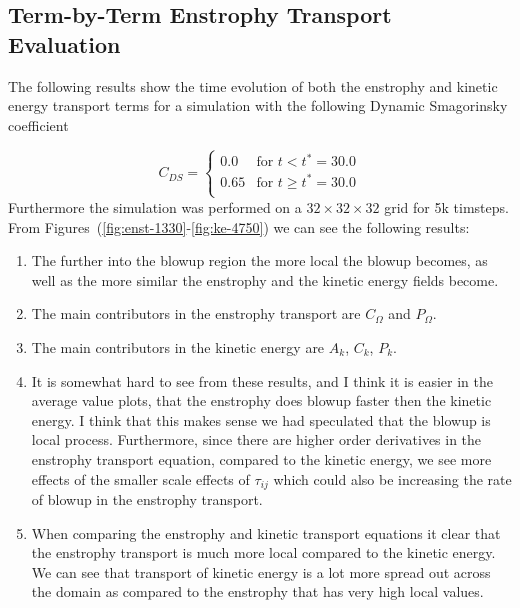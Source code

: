 \newpage
\subsection{Term-by-Term Enstrophy Transport Evaluation}
The following results show the time evolution of both the enstrophy and
kinetic energy transport terms for a simulation with the following Dynamic
Smagorinsky coefficient

\begin{equation}
    C_{DS} = 
    \begin{cases}
        0.0         &   \text{for $t  < t^{\ast} = 30.0$} \\
        0.65        &   \text{for $t \geq t^{\ast} = 30.0 $} \\
    \end{cases}
\end{equation}
Furthermore the simulation was performed on a $32 \times 32 \times 32$ grid
for 5k timsteps.  From Figures~(\ref{fig:enst-1330}-\ref{fig:ke-4750}) we
can see the following results:
\begin{enumerate}
    \item The further into the blowup region the more local the blowup
        becomes, as well as the more similar the enstrophy and the kinetic
        energy fields become.
        
    \item The main contributors in the enstrophy transport are
        $C_{\Omega}$ and $P_{\Omega}$.

    \item The main contributors in the kinetic energy are $A_{k}$, $C_{k}$,
            $P_{k}$. 

    \item It is somewhat hard to see from these results, and I think it is
        easier in the average value plots, that the enstrophy does blowup
        faster then the kinetic energy. I think that this makes sense we
        had speculated that the blowup is local process. Furthermore, since
        there are higher order derivatives in the enstrophy transport
        equation, compared to the kinetic energy, we see more effects of
        the smaller scale effects of $\tau_{ij}$ which could also be
        increasing the rate of blowup in the enstrophy transport.

    \item When comparing the enstrophy and kinetic transport equations it
        clear that the enstrophy transport is much more local compared to
        the kinetic energy. We can see that transport of kinetic energy is
        a lot more spread out across the domain as compared to the
        enstrophy that has very high local values.

\end{enumerate}




